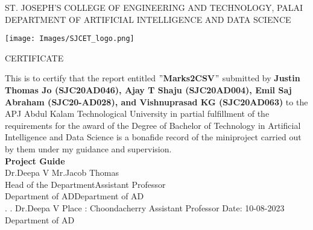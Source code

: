 \thispagestyle{empty}
\begin{center}
\normalsize{ST. JOSEPH’S COLLEGE OF ENGINEERING AND TECHNOLOGY, PALAI}\\[0.5cm]
\normalsize
 { DEPARTMENT OF ARTIFICIAL INTELLIGENCE AND DATA SCIENCE}\\[1.0cm]%
   \begin{center}
   \texttt{[image: Images/SJCET\_logo.png]}
   \end{center}
{\large CERTIFICATE}\\[1.5cm]
\end{center}
\normalsize 
This is to certify that the report entitled {\bf $"$Marks2CSV$"$} submitted by { \bf Justin Thomas Jo (SJC20AD046), Ajay T Shaju (SJC20AD004), Emil Saj Abraham (SJC20-AD028), and Vishnuprasad KG (SJC20AD063)} to the APJ Abdul Kalam Technological University in partial fulfillment of the requirements for the award of the Degree of Bachelor of Technology in Artificial Intelligence and Data Science is a bonafide record of the miniproject carried out by them under my guidance and supervision.\vspace{1.3 cm}\\
{\bf Project Guide}\hspace{8.35 cm}{\bf Project Coordinator}\\
Dr.Deepa V\hspace{9.0 cm} Mr.Jacob Thomas\\
Head of the Department\hspace{6.85 cm}Assistant Professor\hspace{2.6 cm}\\Department of AD\hspace{7.9 cm}Department of AD
\vspace{1.3 cm}\\
.\hspace{11.06 cm}{\bf Head of the Department}
\newline
.\hspace{11.01 cm} Dr.Deepa V
\newline
Place : Choondacherry  \hspace{6.87 cm} Assistant Professor
\newline
Date\hspace{0.25 cm}: 10-08-2023 \hspace{7.7 cm} Department of AD      









